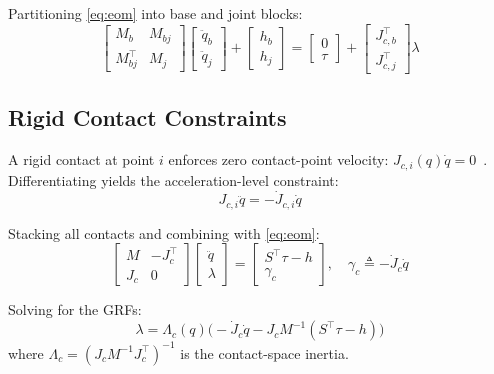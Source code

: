 Partitioning \eqref{eq:eom} into base and joint blocks:
\begin{equation}\label{eq:partition}
  \begin{bmatrix}M_b & M_{bj} \\ M_{bj}^\top & M_j\end{bmatrix}
  \begin{bmatrix}\ddot{q}_b \\ \ddot{q}_j\end{bmatrix}
  +\begin{bmatrix}h_b \\ h_j\end{bmatrix}
  =\begin{bmatrix}0 \\ \tau\end{bmatrix}
  +\begin{bmatrix}J_{c,b}^\top \\ J_{c,j}^\top\end{bmatrix}\lambda
\end{equation}

\subsection{Rigid Contact Constraints}

A rigid contact at point $i$ enforces zero contact-point
velocity: $J_{c,i}(q)\dot{q}=0$~\cite{righetti2011inverse}.
Differentiating yields the acceleration-level constraint:
\begin{equation}\label{eq:contact_acc}
  J_{c,i}\ddot{q} = -\dot{J}_{c,i}\dot{q}
\end{equation}

Stacking all contacts and combining with \eqref{eq:eom}:
\begin{equation}\label{eq:KKT}
  \begin{bmatrix}M & -J_c^\top \\ J_c & 0\end{bmatrix}
  \begin{bmatrix}\ddot{q} \\ \lambda\end{bmatrix}
  =\begin{bmatrix}S^\top\tau-h \\ \gamma_c\end{bmatrix},
  \quad \gamma_c\triangleq-\dot{J}_c\dot{q}
\end{equation}

Solving for the GRFs:
\begin{equation}\label{eq:GRF}
  \lambda = \Lambda_c(q)\bigl(-\dot{J}_c\dot{q}-J_cM^{-1}(S^\top\tau-h)\bigr)
\end{equation}
where $\Lambda_c=(J_cM^{-1}J_c^\top)^{-1}$ is the contact-space inertia.

